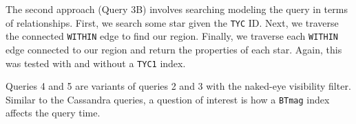 The second approach (Query 3B) involves searching modeling the query in terms of relationships.
First, we search some star given the \texttt{TYC} ID\@.
Next, we traverse the connected \texttt{WITHIN} edge to find our region.
Finally, we traverse each \texttt{WITHIN} edge connected to our region and return the properties of each star.
Again, this was tested with and without a \texttt{TYC1} index.

Queries 4 and 5 are variants of queries 2 and 3 with the naked-eye visibility filter.
Similar to the Cassandra queries, a question of interest is how a \texttt{BTmag} index affects the query time.
